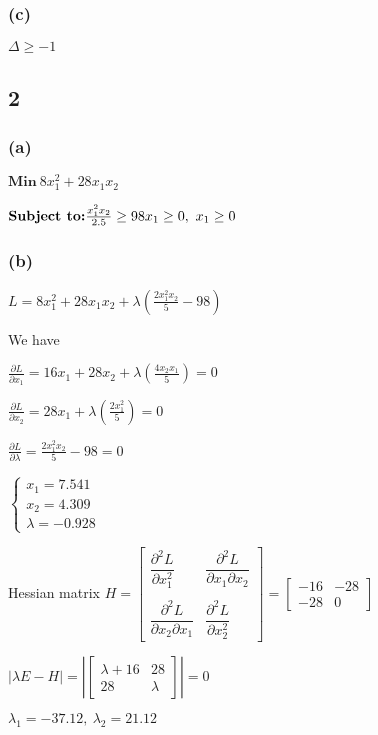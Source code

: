 \documentclass{article}
\begin{document}
\subsubsection*{(c)}
$\Delta \geq -1$

\subsection*{2}
\subsubsection*{(a)}
$\textbf{Min} \  8x_{1}^{2}+28x_{1}x_{2}$\par\indent
\par
$\textbf{Subject to:} \\ \frac{x_{1}^{2}x_{2}}{2.5}\geq98\\
x_{1}\geq0, \ x_{1}\geq0
$
\subsubsection*{(b)}
$L=8x_{1}^{2}+28x_{1}x_{2}+\lambda(\frac{2x_{1}^{2}x_{2}}{5}-98)$\par\indent
\par
We have\par
$\frac{\partial L}{\partial x_{1}}=16x_{1}+28x_{2}+\lambda(\frac{4x_{2}x_{1}}{5})=0$\par
$\frac{\partial L}{\partial x_{2}}=28x_{1}+\lambda(\frac{2x_{1}^{2}}{5})=0$\par
$\frac{\partial L}{\partial \lambda}=\frac{2x_{1}^{2}x_{2}}{5}-98=0$\par
$\begin{cases}x_{1}=7.541\\
x_{2}=4.309\\
\lambda=-0.928\end{cases}$\par\indent
\par
Hessian matrix $H=\begin{bmatrix}
\dfrac{\partial ^{2}L}{\partial x_{1}^{2}} & \dfrac{\partial ^{2}L}{\partial x_{1}\partial x_{2}} \\
\\
\dfrac{\partial ^{2}L}{\partial x_{2}\partial x_{1}} & \dfrac{\partial ^{2}L}{\partial x_{2}^{2}}
\end{bmatrix}=\begin{bmatrix}
-16 & -28 \\
-28 & 0
\end{bmatrix}$\par\indent
\par\indent
\par
$|\lambda E-H|=|\begin{bmatrix}
\lambda+16 & 28 \\
28 & \lambda
\end{bmatrix}|=0$\par\indent
\par\indent
\par
$\lambda_{1}=-37.12, \ \lambda_{2}=21.12$
\end{document}
